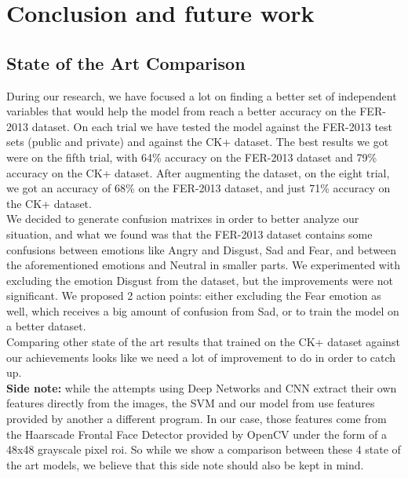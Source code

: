 \documentclass[runningheads,a4paper,11pt]{report}
\begin{document}
\chapter{Conclusion and future work}
\label{chapter:conclusions}

\section{State of the Art Comparison}
\label{section:soa_analysis}

During our research, we have focused a lot on finding a better set of independent variables that would help the model from \cite{Arriaga17} reach a better accuracy on the FER-2013 dataset. On each trial we have tested the model against the FER-2013 test sets (public and private) and against the CK+ dataset. The best results we got were on the fifth trial, with 64\% accuracy on the FER-2013 dataset and 79\% accuracy on the CK+ dataset. After augmenting the dataset, on the eight trial, we got an accuracy of 68\% on the FER-2013 dataset, and just 71\% accuracy on the CK+ dataset. \\
We decided to generate confusion matrixes in order to better analyze our situation, and what we found was that the FER-2013 dataset contains some confusions between emotions like Angry and Disgust, Sad and Fear, and between the aforementioned emotions and Neutral in smaller parts. We experimented with excluding the emotion Disgust from the dataset, but the improvements were not significant. We proposed 2 action points: either excluding the Fear emotion as well, which receives a big amount of confusion from Sad, or to train the model on a better dataset.\\
Comparing other state of the art results that trained on the CK+ dataset against our achievements looks like we need a lot of improvement to do in order to catch up.\\
\textbf{Side note:} while the attempts using Deep Networks \cite{Samadiani19} and CNN \cite{Burkert16} extract their own features directly from the images, the SVM \cite{Samadiani19} and our model from \cite{Arriaga17} use features provided by another a different program. In our case, those features come from the Haarscade Frontal Face Detector provided by OpenCV \cite{opencv} under the form of a 48x48 grayscale pixel roi. So while we show a comparison between these 4 state of the art models, we believe that this side note should also be kept in mind.
\end{document}
